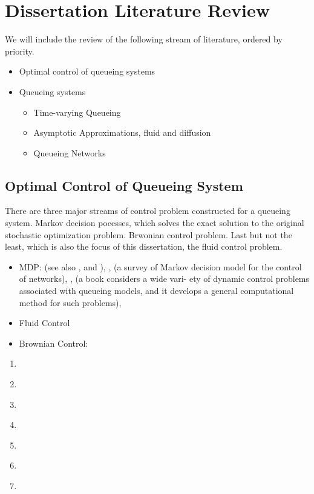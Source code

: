 \section{Dissertation Literature Review}
We will include the review of the following stream of literature, ordered by priority.
\begin{itemize}
    \item Optimal control of queueing systems
    \item Queueing systems
        \begin{itemize}
            \item Time-varying Queueing
            \item Asymptotic Approximations, fluid and diffusion
            \item Queueing Networks
        \end{itemize}
\end{itemize}

\subsection{Optimal Control of Queueing System}
There are three major streams of control problem constructed for a queueing system. Markov decision pocesses, which solves the exact solution to the original stochastic optimization problem. Brwonian control problem. Last but not the least, which is also the focus of this dissertation, the fluid control problem.
\begin{itemize}
    \item MDP: \citet{george2001dynamic} (see also \citet{wijngaard1986forward},\citet{wijngaard2000forward} and \citet{jo1989lagrangian}), \citet{stidham1985optimal}, \citet{stidham1993survey} (a survey of Markov decision model for the control of networks), \citet{weber1987optimal}, \citet{sennott2009stochastic} (a book considers a wide vari- ety of dynamic control problems associated with queueing models, and it develops a general computational method for such problems), \citet{ata2006dynamic}
    \item Fluid Control
    \item Brownian Control: \citet{ghamami2013dynamic}
\end{itemize}
\begin{enumerate}
\item 
\item \citet{harrison1990scheduling}
\item \citet{bassamboo2006design}
\item \citet{ward2008asymptotically}
\item \citet{harrison2000brownian}
\item \citet{harrison1999heavy}
\item \citet{bauerle2002optimal}
\end{enumerate}

